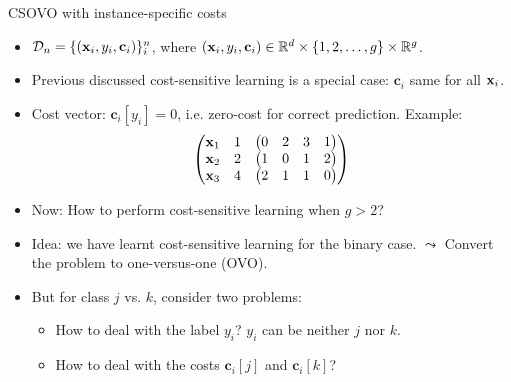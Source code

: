 \documentclass[11pt,compress,t,notes=noshow, xcolor=table]{beamer}
\newcommand{\cv}{\mathbf{c}}    %
\begin{document}
\begin{vbframe}{CSOVO with instance-specific costs}
    \footnotesize
    \begin{itemize}
        \footnotesize
        \item $\Dn = \{(\xv_i, y_i, \cv_i)\}_i^n$, where $(\xv_i, y_i, \cv_i) \in \mathbb{R}^d \times \{1, 2, \ldots, g\} \times \mathbb{R}^g$.
        \vspace{5pt}
        
        \item Previous discussed cost-sensitive learning is a special case: $\cv_i$ same for all $\mathbf{x}_i$.
        \vspace{5pt}
        
        \item Cost vector: $\cv_i[y_i] = 0$, i.e. zero-cost for correct prediction. Example:
        \begin{equation*}
            \begin{aligned}
                \begin{pmatrix} 
                    \mathbf{x}_1 & 1 & \begin{pmatrix} 0 & 2 & 3 & 1 \end{pmatrix} \\
                    \mathbf{x}_2 & 2 & \begin{pmatrix} 1 & 0 & 1 & 2 \end{pmatrix} \\
                    \mathbf{x}_3 & 4 & \begin{pmatrix} 2 & 1 & 1 & 0 \end{pmatrix} \\
                 \end{pmatrix}
            \end{aligned}
        \end{equation*}
        \vspace{5pt}
        \item Now: How to perform cost-sensitive learning when $g > 2$?
        \vspace{5pt}
        
        \item Idea: we have learnt cost-sensitive learning for the binary case. $\leadsto$ Convert the problem to one-versus-one (OVO).
        \vspace{5pt}
        
        \item But for class $j$ vs. $k$, consider two problems:
        \begin{itemize}
            \footnotesize
            \item How to deal with the label $y_i$? $y_i$ can be neither $j$ nor $k$.
            \vspace{5pt}
            
            \item How to deal with the costs $\cv_i[j]$ and $\cv_i[k]$?
        \end{itemize}
            
    \end{itemize}
\end{vbframe}
\end{document}
